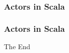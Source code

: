 \documentclass{beamer}
\begin{document}
\begin{frame}
\frametitle{Actors in Scala}
\end{frame}


\begin{frame}[fragile]
\frametitle{Actors in Scala}
\end{frame}


\begin{frame}
\Huge{\centerline{The End}}
\end{frame}

\end{document}
